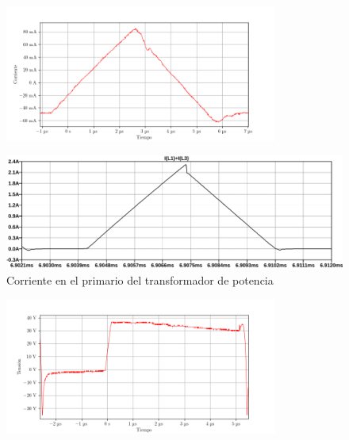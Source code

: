 
\begin{figure}[H]
    \centering
    \includegraphics[width=0.8\textwidth]{images/capturas-osciloscopio/17-11-2022/24.png}
    \caption{}
    \label{fig:osc:24}
\end{figure}

\begin{figure}[H]
    \centering
    \includegraphics[width=\textwidth]{images/sim/12.pdf}
    \caption{Corriente en el primario del transformador de potencia}
    \label{fig:sim:12}
\end{figure}


\begin{figure}[H]
    \centering
    \includegraphics[width=0.8\textwidth]{images/capturas-osciloscopio/17-11-2022/60.png}
    \caption{}
    \label{fig:osc:60}
\end{figure}

